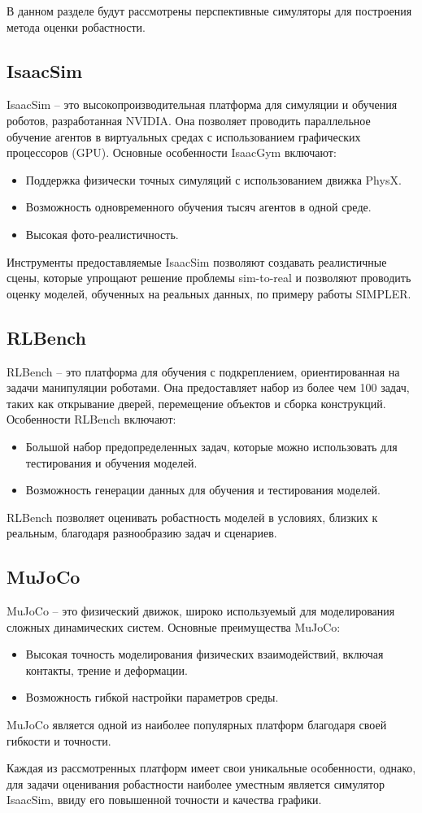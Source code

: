     В данном разделе будут рассмотрены перспективные симуляторы для построения метода оценки робастности.

    \subsection{IsaacSim}
    IsaacSim \cite{nvidia_isaac_sim} -- это высокопроизводительная платформа для симуляции и обучения роботов, разработанная NVIDIA. Она позволяет проводить параллельное обучение агентов в виртуальных средах с использованием графических процессоров (GPU). Основные особенности IsaacGym включают:
    \begin{itemize}
        \item Поддержка физически точных симуляций с использованием движка PhysX.
        \item Возможность одновременного обучения тысяч агентов в одной среде.
        \item Высокая фото-реалистичность.
    \end{itemize}
    
    Инструменты предоставляемые IsaacSim позволяют создавать реалистичные сцены, которые упрощают решение проблемы sim-to-real и позволяют проводить оценку моделей, обученных на реальных данных, по примеру работы SIMPLER.
    
    \subsection{RLBench}
    RLBench \cite{james2020rlbench} -- это платформа для обучения с подкреплением, ориентированная на задачи манипуляции роботами. Она предоставляет набор из более чем 100 задач, таких как открывание дверей, перемещение объектов и сборка конструкций. Особенности RLBench включают:
    \begin{itemize}
        \item Большой набор предопределенных задач, которые можно использовать для тестирования и обучения моделей.
        \item Возможность генерации данных для обучения и тестирования моделей.
    \end{itemize}
    RLBench позволяет оценивать робастность моделей в условиях, близких к реальным, благодаря разнообразию задач и сценариев.
    
    \subsection{MuJoCo}
    MuJoCo \cite{todorov2012mujoco} -- это физический движок, широко используемый для моделирования сложных динамических систем. Основные преимущества MuJoCo:
    \begin{itemize}
        \item Высокая точность моделирования физических взаимодействий, включая контакты, трение и деформации.
        \item Возможность гибкой настройки параметров среды.
    \end{itemize}
    MuJoCo является одной из наиболее популярных платформ благодаря своей гибкости и точности.

    Каждая из рассмотренных платформ имеет свои уникальные особенности, однако, для задачи оценивания робастности наиболее уместным является симулятор IsaacSim, ввиду его повышенной точности и качества графики. 